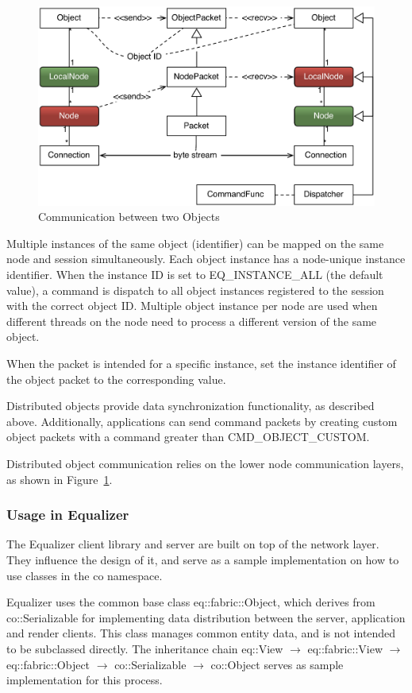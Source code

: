 \documentclass[10pt,a4]{scrartcl}
\newcommand{\fig}[1]{Figure~\ref{#1}}
\begin{document}
\begin{figure}
  \includegraphics[width=.618\textwidth]{images/netObject.pdf}
  {\caption{\label{fNetObject}Communication between two Objects}}
\end{figure}
Multiple instances of the same object (identifier) can be mapped on the same
node and session simultaneously. Each object instance has a node-unique instance
identifier. When the instance ID is set to \textsf{EQ\_INSTANCE\_ALL} (the
default value), a command is dispatch to all object instances registered to the
session with the correct object ID. Multiple object instance per node are used
when different threads on the node need to process a different version of the
same object.

When the packet is intended for a specific instance, set the instance identifier
of the object packet to the corresponding value.

Distributed objects provide data synchronization functionality, as described
above. Additionally, applications can send command packets by creating custom
object packets with a command greater than \textsf{CMD\_OBJECT\_CUSTOM}.

Distributed object communication relies on the lower node communication layers,
as shown in \fig{fNetObject}.

\subsubsection{\label{sNetUsage}Usage in Equalizer}

The Equalizer client library and server are built on top of the network
layer. They influence the design of it, and serve as a sample
implementation on how to use classes in the \textsf{co} namespace.

Equalizer uses the common base class \textsf{eq::fabric::Object}, which derives
from \textsf{co::Se\-ria\-lizable} for implementing data distribution between
the server, application and render clients. This class manages common entity
data, and is not intended to be subclassed directly.  The inheritance chain
\textsf{eq::View} $\rightarrow$ \textsf{eq::fabric::View} $\rightarrow$
\textsf{eq::fabric::Ob\-ject} $\rightarrow$ \textsf{co::Se\-rial\-izable}
$\rightarrow$ \textsf{co::Object} serves as sample implementation for this
process.
\end{document}
